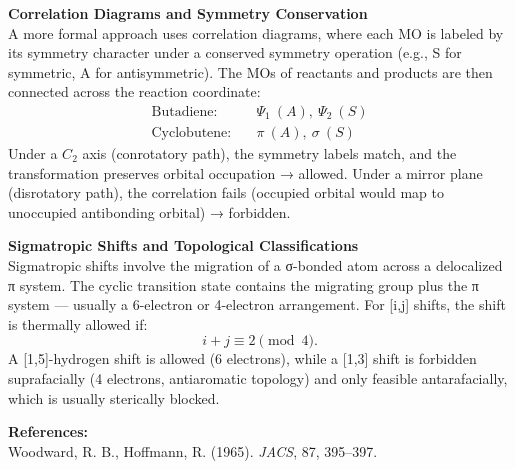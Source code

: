 \begin{technical}
\noindent\textbf{Correlation Diagrams and Symmetry Conservation}\\[0.5em]
A more formal approach uses correlation diagrams, where each MO is labeled by its symmetry character under a conserved symmetry operation (e.g., S for symmetric, A for antisymmetric). The MOs of reactants and products are then connected across the reaction coordinate:
\begin{align*}
\text{Butadiene:} & \quad \Psi_1\ (A),\ \Psi_2\ (S) \\
\text{Cyclobutene:} & \quad \pi\ (A),\ \sigma\ (S)
\end{align*}
Under a \( C_2 \) axis (conrotatory path), the symmetry labels match, and the transformation preserves orbital occupation → allowed. Under a mirror plane (disrotatory path), the correlation fails (occupied orbital would map to unoccupied antibonding orbital) → forbidden.

\noindent\textbf{Sigmatropic Shifts and Topological Classifications}\\[0.5em]
Sigmatropic shifts involve the migration of a σ-bonded atom across a delocalized π system. The cyclic transition state contains the migrating group plus the π system — usually a 6-electron or 4-electron arrangement. For [i,j] shifts, the shift is thermally allowed if:
\[
i + j \equiv 2 \pmod{4}.
\]
A [1,5]-hydrogen shift is allowed (6 electrons), while a [1,3] shift is forbidden suprafacially (4 electrons, antiaromatic topology) and only feasible antarafacially, which is usually sterically blocked.


\noindent\textbf{References:}\\
Woodward, R. B., Hoffmann, R. (1965). \textit{JACS}, 87, 395–397.\\
\end{technical}
